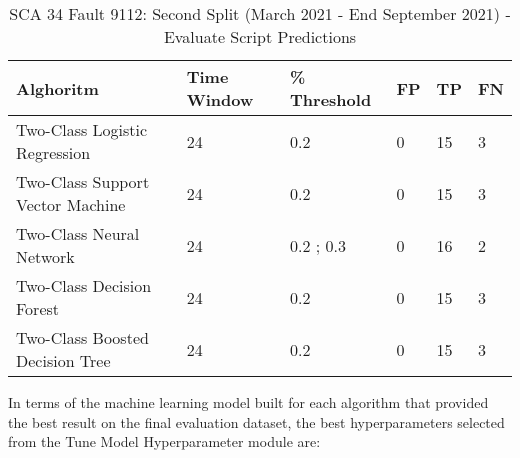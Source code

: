 \begin{table}[!ht]
    \centering
    \begin{tabular}{|l|l|l|l|l|l|}
    \hline
        Alghoritm & Time Window & \% Threshold & FP & TP & FN \\ \hline
        Two-Class Logistic Regression & 24 & 0.2 & 0 & 15 & 3 \\ \hline
        Two-Class Support Vector Machine & 24 & 0.2 & 0 & 15 & 3 \\ \hline
        Two-Class Neural Network & 24 & 0.2 ; 0.3 & 0 & 16 & 2 \\ \hline
        Two-Class Decision Forest & 24 & 0.2 & 0 & 15 & 3 \\ \hline
        Two-Class Boosted Decision Tree & 24 & 0.2 & 0 & 15 & 3 \\ \hline
    \end{tabular}
	\caption{SCA 34 Fault 9112: Second Split (March 2021 - End September 2021) - Evaluate Script Predictions}
    \label{9112_SCA34_3rd}
\end{table}

In terms of the machine learning model built for each algorithm that provided the best result on the final evaluation dataset, the best hyperparameters selected from the Tune Model Hyperparameter module are:

